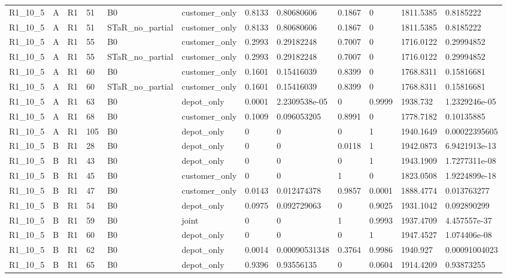 \begin{longtable}{llllllllllll}
R1\_10\_5 & A & R1 & 51 & B0 & customer\_only & 0.8133 & 0.80680606 & 0.1867 & 0 & 1811.5385 & 0.8185222 \\
R1\_10\_5 & A & R1 & 51 & STaR\_no\_partial & customer\_only & 0.8133 & 0.80680606 & 0.1867 & 0 & 1811.5385 & 0.8185222 \\
R1\_10\_5 & A & R1 & 55 & B0 & customer\_only & 0.2993 & 0.29182248 & 0.7007 & 0 & 1716.0122 & 0.29994852 \\
R1\_10\_5 & A & R1 & 55 & STaR\_no\_partial & customer\_only & 0.2993 & 0.29182248 & 0.7007 & 0 & 1716.0122 & 0.29994852 \\
R1\_10\_5 & A & R1 & 60 & B0 & customer\_only & 0.1601 & 0.15416039 & 0.8399 & 0 & 1768.8311 & 0.15816681 \\
R1\_10\_5 & A & R1 & 60 & STaR\_no\_partial & customer\_only & 0.1601 & 0.15416039 & 0.8399 & 0 & 1768.8311 & 0.15816681 \\
R1\_10\_5 & A & R1 & 63 & B0 & depot\_only & 0.0001 & 2.2309538e-05 & 0 & 0.9999 & 1938.732 & 1.2329246e-05 \\
R1\_10\_5 & A & R1 & 68 & B0 & customer\_only & 0.1009 & 0.096053205 & 0.8991 & 0 & 1778.7182 & 0.10135885 \\
R1\_10\_5 & A & R1 & 105 & B0 & depot\_only & 0 & 0 & 0 & 1 & 1940.1649 & 0.00022395605 \\
R1\_10\_5 & B & R1 & 28 & B0 & depot\_only & 0 & 0 & 0.0118 & 1 & 1942.0873 & 6.9421913e-13 \\
R1\_10\_5 & B & R1 & 43 & B0 & depot\_only & 0 & 0 & 0 & 1 & 1943.1909 & 1.7277311e-08 \\
R1\_10\_5 & B & R1 & 45 & B0 & customer\_only & 0 & 0 & 1 & 0 & 1823.0508 & 1.9224899e-18 \\
R1\_10\_5 & B & R1 & 47 & B0 & customer\_only & 0.0143 & 0.012474378 & 0.9857 & 0.0001 & 1888.4774 & 0.013763277 \\
R1\_10\_5 & B & R1 & 54 & B0 & depot\_only & 0.0975 & 0.092729063 & 0 & 0.9025 & 1931.1042 & 0.092890299 \\
R1\_10\_5 & B & R1 & 59 & B0 & joint & 0 & 0 & 1 & 0.9993 & 1937.4709 & 4.457557e-37 \\
R1\_10\_5 & B & R1 & 60 & B0 & depot\_only & 0 & 0 & 0 & 1 & 1947.4527 & 1.074406e-08 \\
R1\_10\_5 & B & R1 & 62 & B0 & depot\_only & 0.0014 & 0.00090531348 & 0.3764 & 0.9986 & 1940.927 & 0.00091004023 \\
R1\_10\_5 & B & R1 & 65 & B0 & depot\_only & 0.9396 & 0.93556135 & 0 & 0.0604 & 1914.4209 & 0.93873255 \\

\end{longtable}
